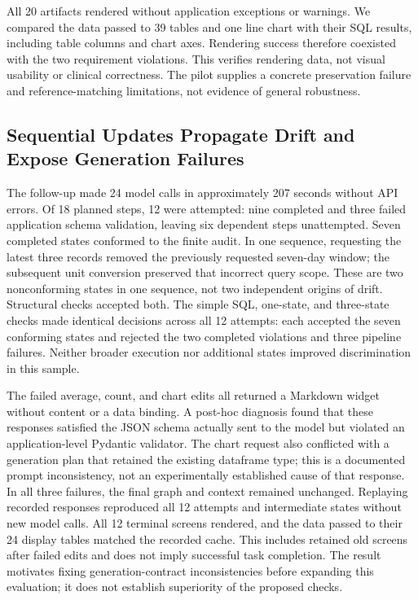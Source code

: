 \documentclass[manuscript,review,anonymous]{acmart}
\begin{document}
All 20 artifacts rendered without application exceptions or warnings. We compared the data passed to 39 tables and one line chart with their SQL results, including table columns and chart axes. Rendering success therefore coexisted with the two requirement violations. This verifies rendering data, not visual usability or clinical correctness. The pilot supplies a concrete preservation failure and reference-matching limitations, not evidence of general robustness.

\subsection{Sequential Updates Propagate Drift and Expose Generation Failures}

The follow-up made 24 model calls in approximately 207 seconds without API errors. Of 18 planned steps, 12 were attempted: nine completed and three failed application schema validation, leaving six dependent steps unattempted. Seven completed states conformed to the finite audit. In one sequence, requesting the latest three records removed the previously requested seven-day window; the subsequent unit conversion preserved that incorrect query scope. These are two nonconforming states in one sequence, not two independent origins of drift. Structural checks accepted both. The simple SQL, one-state, and three-state checks made identical decisions across all 12 attempts: each accepted the seven conforming states and rejected the two completed violations and three pipeline failures. Neither broader execution nor additional states improved discrimination in this sample.

The failed average, count, and chart edits all returned a Markdown widget without content or a data binding. A post-hoc diagnosis found that these responses satisfied the JSON schema actually sent to the model but violated an application-level Pydantic validator. The chart request also conflicted with a generation plan that retained the existing dataframe type; this is a documented prompt inconsistency, not an experimentally established cause of that response. In all three failures, the final graph and context remained unchanged. Replaying recorded responses reproduced all 12 attempts and intermediate states without new model calls. All 12 terminal screens rendered, and the data passed to their 24 display tables matched the recorded cache. This includes retained old screens after failed edits and does not imply successful task completion. The result motivates fixing generation-contract inconsistencies before expanding this evaluation; it does not establish superiority of the proposed checks.
\end{document}
